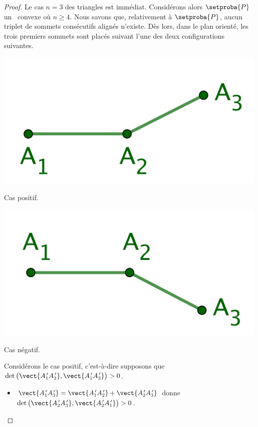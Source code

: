 \begin{proof}
	Le cas $n = 3$ des triangles est immédiat.
	Considérons alors $\setproba{P}$ un \ngone\ convexe où  $n \geq 4$.
	Nous savons que, relativement à $\setproba{P}$, aucun triplet de sommets consécutifs alignés n'existe.
	Dès lors, dans le plan orienté, les trois premiers sommets sont placés suivant l'une des deux configurations suivantes. 
    
    \begin{multicols}{2}
        \small\itshape\centering
       	\includegraphics[scale=.45]{content/polygon/at-least-one/conv-det-sign-1.png}
    	    
    	\smallskip
        Cas positif.
        
        \includegraphics[scale=.45]{content/polygon/at-least-one/conv-det-sign-2.png}
    	    
    	\smallskip
        Cas négatif.
    \end{multicols}

    


    \noindent
    Considérons le cas positif, c'est-à-dire supposons que 
    $\det \big( \vect{\primeit{A}_1 \primeit{A}_2}, \vect{\primeit{A}_1 \primeit{A}_3} \big) > 0$.
	\begin{itemize}
    	\item $\vect{\primeit{A}_1 \primeit{A}_3} = \vect{\primeit{A}_1 \primeit{A}_2} + \vect{\primeit{A}_2 \primeit{A}_3}$
    	donne
		$\det \big( \vect{\primeit{A}_2 \primeit{A}_3}, \vect{\primeit{A}_2 \primeit{A}_1} \big) > 0$.



\end{itemize}
\end{proof}
